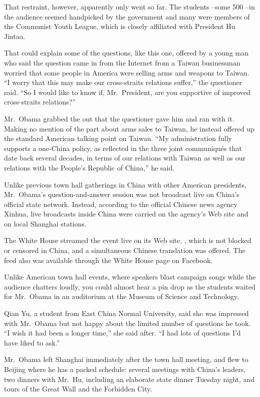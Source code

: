 ﻿\documentclass[12pt]{article}
\begin{document}
That restraint, however, apparently only went so far. The students --some 500 --in the audience
seemed handpicked by the government and many were members of the Communist Youth League, which is
closely affiliated with President Hu Jintao.

That could explain some of the questions, like this one, offered by a young man who said the
question came in from the Internet from a Taiwan businessman worried that some people in America
were selling arms and weapons to Taiwan. ``I worry that this may make our cross-straits relations
suffer,'' the questioner said. ``So I would like to know if, Mr.~President, are you supportive of
improved cross-straits relations?''

Mr.~Obama grabbed the out that the questioner gave him and ran with it. Making no mention of the
part about arms sales to Taiwan, he instead offered up the standard American talking point on
Taiwan. ``My administration fully supports a one-China policy, as reflected in the three joint
communiqu\'es that date back several decades, in terms of our relations with Taiwan as well as our
relations with the People's Republic of China,'' he said.

Unlike previous town hall gatherings in China with other American presidents, Mr.~Obama's
question-and-answer session was not broadcast live on China's official state network. Instead,
according to the official Chinese news agency Xinhua, live broadcasts inside China were carried on
the agency's Web site and on local Shanghai stations.

The White House streamed the event live on its Web site, , which is not blocked or censored in
China, and a simultaneous Chinese translation was offered. The feed also was available through the
White House page on Facebook.

Unlike American town hall events, where speakers blast campaign songs while the audience chatters
loudly, you could almost hear a pin drop as the students waited for Mr.~Obama in an auditorium at
the Museum of Science and Technology.

Qian Yu, a student from East China Normal University, said she was impressed with Mr.~Obama but not
happy about the limited number of questions he took. ``I wish it had been a longer time,'' she said
after. ``I had lots of questions I'd have liked to ask.''

Mr.~Obama left Shanghai immediately after the town hall meeting, and flew to Beijing where he has a
packed schedule: several meetings with China's leaders, two dinners with Mr.~Hu, including an
elaborate state dinner Tuesday night, and tours of the Great Wall and the Forbidden City.
\end{document}
